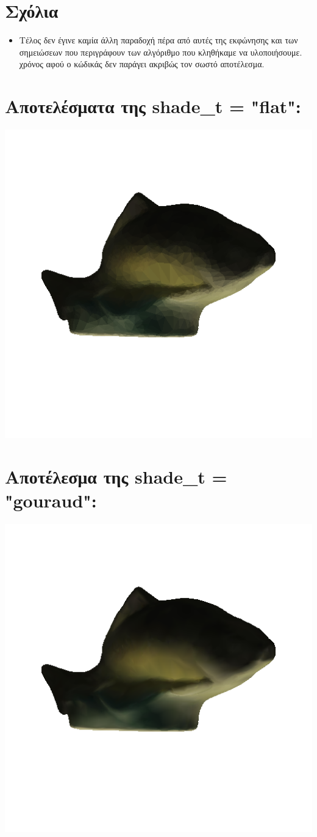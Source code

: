 \documentclass[10pt,a4paper]{article}
\begin{document}
\section*{Σχόλια}
\begin{itemize}
  \item Τέλος δεν έγινε καμία άλλη παραδοχή πέρα από αυτές της εκφώνησης και των σημειώσεων που περιγράφουν των αλγόριθμο που κληθήκαμε να υλοποιήσουμε.
  χρόνος αφού ο κώδικάς δεν παράγει ακριβώς τον σωστό αποτέλεσμα.
\end{itemize}


\section*{Αποτελέσματα της \textlatin{shade\_t = "flat"}:} 
\includegraphics[scale=0.8]{flat.png}

\section*{Αποτέλεσμα της \textlatin{shade\_t = "gouraud"}:}
\includegraphics[scale=0.8]{gouraud.png}
\end{document}
